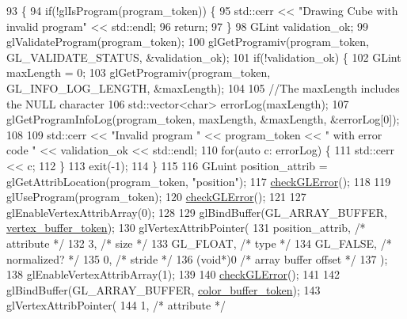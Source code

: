 \begin{DoxyCode}
93                                          \{
94   \textcolor{keywordflow}{if}(!glIsProgram(program\_token)) \{
95     std::cerr << \textcolor{stringliteral}{"Drawing Cube with invalid program"} << std::endl;
96     \textcolor{keywordflow}{return};
97   \}
98   GLint validation\_ok;
99   glValidateProgram(program\_token);
100   glGetProgramiv(program\_token, GL\_VALIDATE\_STATUS, &validation\_ok);
101   \textcolor{keywordflow}{if}(!validation\_ok) \{
102     GLint maxLength = 0;
103     glGetProgramiv(program\_token, GL\_INFO\_LOG\_LENGTH, &maxLength);
104 
105     \textcolor{comment}{//The maxLength includes the NULL character}
106     std::vector<char> errorLog(maxLength);
107     glGetProgramInfoLog(program\_token, maxLength, &maxLength, &errorLog[0]);
108 
109     std::cerr << \textcolor{stringliteral}{"Invalid program "} << program\_token << \textcolor{stringliteral}{" with error code "} << validation\_ok << std::endl;
110     \textcolor{keywordflow}{for}(\textcolor{keyword}{auto} c: errorLog) \{
111       std::cerr << c;
112     \}
113     exit(-1);
114   \}
115 
116   GLuint position\_attrib = glGetAttribLocation(program\_token, \textcolor{stringliteral}{"position"});
117   \hyperlink{CubeAsset_8cc_a75f201b0e53e68726854997957322b8d}{checkGLError}();
118 
119   glUseProgram(program\_token);
120   \hyperlink{CubeAsset_8cc_a75f201b0e53e68726854997957322b8d}{checkGLError}();
121 
127   glEnableVertexAttribArray(0);
128 
129   glBindBuffer(GL\_ARRAY\_BUFFER, \hyperlink{classCubeAsset_a31bd098f60e2c24988316a9cc9335987}{vertex\_buffer\_token});
130   glVertexAttribPointer(
131                         position\_attrib,               \textcolor{comment}{/* attribute */}
132                         3,                             \textcolor{comment}{/* size */}
133                         GL\_FLOAT,                      \textcolor{comment}{/* type */}
134                         GL\_FALSE,                      \textcolor{comment}{/* normalized? */}
135                         0,                             \textcolor{comment}{/* stride */}
136                         (\textcolor{keywordtype}{void}*)0                       \textcolor{comment}{/* array buffer offset */}
137                         );
138   glEnableVertexAttribArray(1);
139 
140   \hyperlink{CubeAsset_8cc_a75f201b0e53e68726854997957322b8d}{checkGLError}();
141 
142   glBindBuffer(GL\_ARRAY\_BUFFER, \hyperlink{classCubeAsset_a4cb558d463a5fa01ba7fdd884e697a73}{color\_buffer\_token});
143   glVertexAttribPointer(
144                         1,                             \textcolor{comment}{/* attribute */}

\end{DoxyCode}
